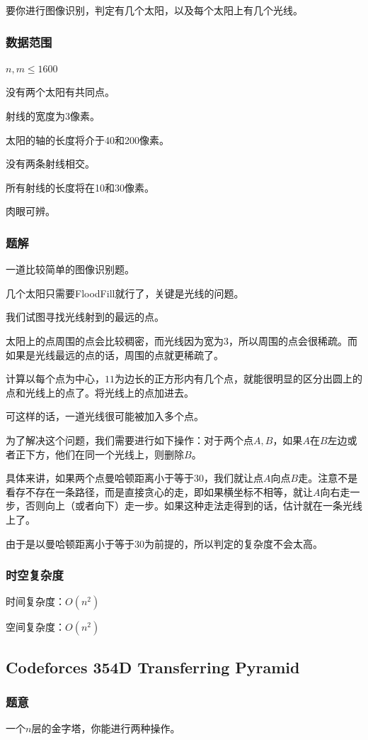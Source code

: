 \documentclass{ctexart}
\begin{document}
要你进行图像识别，判定有几个太阳，以及每个太阳上有几个光线。
\subsubsection{数据范围}
$n,m \le 1600$

没有两个太阳有共同点。

射线的宽度为3像素。

太阳的轴的长度将介于40和200像素。

没有两条射线相交。

所有射线的长度将在10和30像素。

肉眼可辨。
\subsubsection{题解}
一道比较简单的图像识别题。

几个太阳只需要FloodFill就行了，关键是光线的问题。

我们试图寻找光线射到的最远的点。

太阳上的点周围的点会比较稠密，而光线因为宽为$3$，所以周围的点会很稀疏。而如果是光线最远的点的话，周围的点就更稀疏了。

计算以每个点为中心，$11$为边长的正方形内有几个点，就能很明显的区分出圆上的点和光线上的点了。将光线上的点加进去。

可这样的话，一道光线很可能被加入多个点。

为了解决这个问题，我们需要进行如下操作：对于两个点$A,B$，如果$A$在$B$左边或者正下方，他们在同一个光线上，则删除$B$。

具体来讲，如果两个点曼哈顿距离小于等于$30$，我们就让点$A$向点$B$走。注意不是看存不存在一条路径，而是直接贪心的走，即如果横坐标不相等，就让$A$向右走一步，否则向上（或者向下）走一步。如果这种走法走得到的话，估计就在一条光线上了。

由于是以曼哈顿距离小于等于$30$为前提的，所以判定的复杂度不会太高。
\subsubsection{时空复杂度}
时间复杂度：$O(n^2)$

空间复杂度：$O(n^2)$
\subsection{Codeforces 354D Transferring Pyramid}
\subsubsection{题意}
一个$n$层的金字塔，你能进行两种操作。
\end{document}
